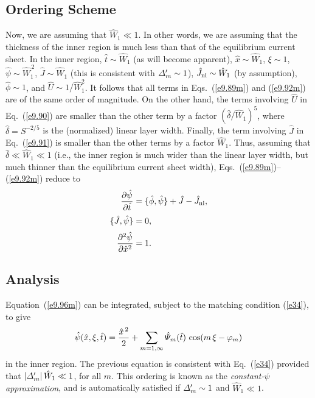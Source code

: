 \documentclass[12pt,prb,aps]{revtex4-1}
\begin{document}
\subsection{Ordering Scheme}
Now, we are assuming that $\hat{W}_1\ll 1$. In other words, we are assuming that the thickness of the
inner region is much less than that of the equilibrium current sheet. In the inner region,
$\hat{t}\sim \hat{W}_1$ (as will become apparent), $\hat{x}\sim \hat{W}_1$, $\xi\sim 1$, $\hat{\psi}\sim \hat{W}_1^{\,2}$, $\hat{J}\sim \hat{W}_1$ (this is
consistent with ${\mit\Delta}_m'\sim 1$), $\hat{J}_{\rm ni}\sim \hat{W}_1$ (by assumption), 
$\hat{\phi}\sim 1$, and $\hat{U}\sim 1/\hat{W}_1^2$.  It follows that all terms in Eqs.~(\ref{e9.89m}) and (\ref{e9.92m}) are of the same order of magnitude. On the other hand, the terms involving $\hat{U}$ in Eq.~(\ref{e9.90}) are 
smaller than the other term by a factor $(\hat{\delta}/\hat{W}_1)^5$, where $\hat{\delta}=S^{-2/5}$ is
the (normalized) linear layer width.\cite{fkr} Finally, the term involving $\hat{J}$ in Eq.~(\ref{e9.91})
is smaller than the other terms by a factor $\hat{W}_1$. Thus, assuming that $\hat{\delta}\ll \hat{W}_1\ll 1$ (i.e.,
the inner region is much wider than the linear layer width, but much thinner than the equilibrium current sheet width), Eqs.~(\ref{e9.89m})--(\ref{e9.92m})
reduce to 
\begin{align}
\frac{\partial\hat{\psi}}{\partial\hat{t}}&=\{\skew{3}\hat{\phi},\hat{\psi}\}+\hat{J}-\hat{J}_{\rm ni},\label{e9.94m}\\[0.5ex]
\{\hat{J},\hat{\psi}\}& = 0,\label{e9.95m}\\[0.5ex]
\frac{\partial^2\hat{\psi}}{\partial \hat{x}^2} &= 1\label{e9.96m}.
\end{align}


\subsection{Analysis}
Equation~(\ref{e9.96m}) can be integrated, subject to the matching condition (\ref{e34}), to give
\begin{equation}\label{e38}
\hat{\psi}(\hat{x},\xi,\hat{t}) = \frac{\hat{x}^{\,2}}{2} + \sum_{m=1,\infty}\hat{\mit \Psi}_m(\hat{t})\,\cos(m\,\xi-\varphi_m)
\end{equation}
in the inner region.
The previous equation is consistent with Eq.~(\ref{e34}) provided that $|{\mit\Delta}_m'|\,\hat{W}_1\ll 1$, for all $m$.  This ordering is
known as the {\em constant-$\psi$ approximation},\cite{fkr} and is automatically satisfied if ${\mit\Delta}_m'\sim 1$ and
$\hat{W}_1\ll 1$. 
\end{document}
